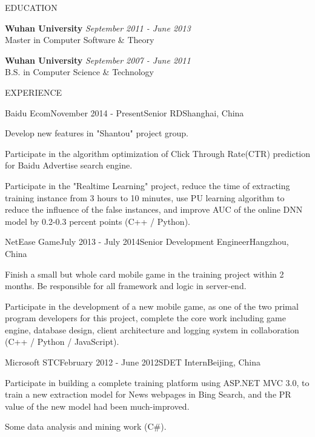 \documentclass{resume} %
\begin{document}
\begin{rSection}{EDUCATION}

{\bf Wuhan University} \hfill {\em September 2011 - June 2013} \\
Master in Computer Software \& Theory
\vspace{0.3em}

{\bf Wuhan University} \hfill {\em September 2007 - June 2011} \\
B.S. in Computer Science \& Technology
\vspace{0.5em}

\end{rSection}

\begin{rSection}{EXPERIENCE}

\begin{rSubsection}{Baidu Ecom}{November 2014 - Present}{Senior RD}{Shanghai, China}
\item Develop new features in "Shantou" project group.
\item Participate in the algorithm optimization of Click Through Rate(CTR) prediction for Baidu Advertise search engine.
\item Participate in the "Realtime Learning" project, reduce the time of extracting training instance from 3 hours to 10 minutes, use PU learning algorithm to reduce the influence of the false instances, and improve AUC of the online DNN model by 0.2-0.3 percent points (C++ / Python).
\end{rSubsection}

\begin{rSubsection}{NetEase Game}{July 2013 - July 2014}{Senior Development Engineer}{Hangzhou, China}
\item Finish a small but whole card mobile game in the training project within 2 months. Be responsible for all framework and logic in server-end.
\item Participate in the development of a new mobile game, as one of the two primal program developers for this project, complete the core work including game engine, database design, client architecture and logging system in collaboration (C++ / Python / JavaScript).

\end{rSubsection}
\begin{rSubsection}{Microsoft STC}{February 2012 - June 2012}{SDET Intern}{Beijing, China}
\item Participate in building a complete training platform using ASP.NET MVC 3.0, to train a new extraction model for News webpages in Bing Search, and the PR value of the new model had been much-improved.
\item Some data analysis and mining work (C\#).
\end{rSubsection}

\end{rSection}
\end{document}
